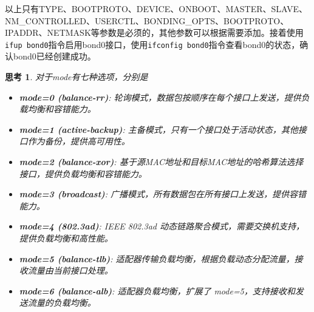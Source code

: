 \documentclass[12pt, twoside, openany]{book}
\theoremstyle{brack}
\newtheorem{change}{思考}[lab]
\begin{document}
以上只有TYPE、BOOTPROTO、DEVICE、ONBOOT、MASTER、SLAVE、NM\_CONTROLLED、USERCTL、BONDING\_OPTS、BOOTPROTO、IPADDR、NETMASK等参数是必须的，其他参数可以根据需要添加。接着使用\lstinline|ifup bond0|指令启用bond0接口，使用\lstinline|ifconfig bond0|指令查看bond0的状态，确认bond0已经创建成功。
\begin{change}
对于mode有七种选项，分别是
\begin{itemize}
  \item \textbf{mode=0 (balance-rr)}: 轮询模式，数据包按顺序在每个接口上发送，提供负载均衡和容错能力。
  \item \textbf{mode=1 (active-backup)}: 主备模式，只有一个接口处于活动状态，其他接口作为备份，提供高可用性。
  \item \textbf{mode=2 (balance-xor)}: 基于源MAC地址和目标MAC地址的哈希算法选择接口，提供负载均衡和容错能力。
  \item \textbf{mode=3 (broadcast)}: 广播模式，所有数据包在所有接口上发送，提供容错能力。
  \item \textbf{mode=4 (802.3ad)}: IEEE 802.3ad 动态链路聚合模式，需要交换机支持，提供负载均衡和高性能。
  \item \textbf{mode=5 (balance-tlb)}: 适配器传输负载均衡，根据负载动态分配流量，接收流量由当前接口处理。
  \item \textbf{mode=6 (balance-alb)}: 适配器负载均衡，扩展了 mode=5，支持接收和发送流量的负载均衡。
\end{itemize}
\end{change}
\end{document}

